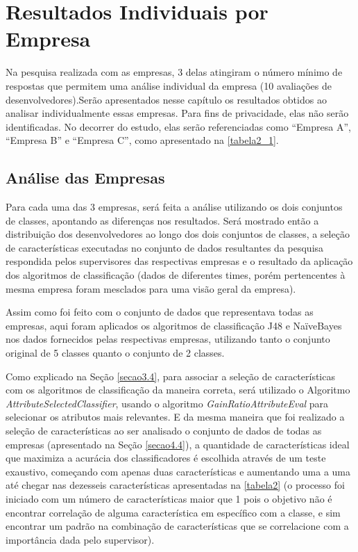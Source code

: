 \chapter[Resultados Individuais por Empresa]{Resultados Individuais por Empresa}

Na pesquisa realizada com as empresas, 3 delas atingiram o número mínimo de respostas que permitem uma análise individual da empresa (10 avaliações de desenvolvedores).Serão apresentados nesse capítulo os resultados obtidos ao analisar individualmente essas empresas. Para fins de privacidade, elas não serão identificadas. No decorrer do estudo, elas serão referenciadas como “Empresa A”, “Empresa B” e “Empresa C”, como apresentado na \ref{tabela2_1}.

\section{Análise das Empresas}

Para cada uma das 3 empresas, será feita a análise utilizando os dois conjuntos de classes, apontando as diferenças nos resultados. Será mostrado então a distribuição dos desenvolvedores ao longo dos dois conjuntos de classes, a seleção de características executadas no conjunto de dados resultantes da pesquisa respondida pelos supervisores das respectivas empresas e o resultado da aplicação dos algoritmos de classificação (dados de diferentes times, porém pertencentes à mesma empresa foram mesclados para uma visão geral da empresa).

Assim como foi feito com o conjunto de dados que representava todas as empresas, aqui foram aplicados os algoritmos de classificação J48 e NaïveBayes nos dados fornecidos pelas respectivas empresas, utilizando tanto o conjunto original de 5 classes quanto o conjunto de 2 classes. 

Como explicado na Seção \ref{secao3.4}, para associar a seleção de características com os algoritmos de classificação da maneira correta, será utilizado o Algoritmo \textit{AttributeSelectedClassifier}, usando o algoritmo \textit{GainRatioAttributeEval} para selecionar os atributos mais relevantes. E da mesma maneira que foi realizado a seleção de características ao ser analisado o conjunto de dados de todas as empresas (apresentado na Seção \ref{secao4.4}), a quantidade de características ideal que maximiza a acurácia dos classificadores é escolhida através de um teste exaustivo, começando com apenas duas características e aumentando uma a uma até chegar nas dezesseis características apresentadas na \autoref{tabela2} (o processo foi iniciado com um número de características maior que 1 pois o objetivo não é encontrar correlação de alguma característica em específico com a classe, e sim encontrar um padrão na combinação de características que se correlacione com a importância dada pelo supervisor).

